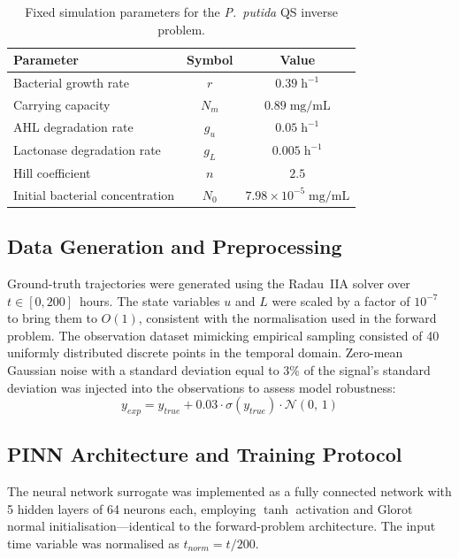 \documentclass[14pt,a4paper,openany]{extbook}
\begin{document}
\begin{table}[hbt]
\centering
\caption[QS Inverse Problem: Fixed Parameters]{Fixed simulation parameters for the \textit{P.~putida} QS inverse problem.}
\label{tab:qs_inverse_fixed}
\begin{tabular}{lcc}
\hline
\textbf{Parameter} & \textbf{Symbol} & \textbf{Value} \\ \hline
Bacterial growth rate & $r$ & $0.39\;\mathrm{h}^{-1}$ \\
Carrying capacity & $N_m$ & $0.89\;\text{mg/mL}$ \\
AHL degradation rate & $g_u$ & $0.05\;\mathrm{h}^{-1}$ \\
Lactonase degradation rate & $g_L$ & $0.005\;\mathrm{h}^{-1}$ \\
Hill coefficient & $n$ & $2.5$ \\
Initial bacterial concentration & $N_0$ & $7.98 \times 10^{-5}\;\text{mg/mL}$ \\ \hline
\end{tabular}
\end{table}

\subsection{Data Generation and Preprocessing}
\label{subsec:qs_inverse_data}

Ground-truth trajectories were generated using the Radau~IIA solver over $t \in [0, 200]$~hours. The state variables $u$ and $L$ were scaled by a factor of $10^{-7}$ to bring them to $O(1)$, consistent with the normalisation used in the forward problem. The observation dataset mimicking empirical sampling consisted of 40 uniformly distributed discrete points in the temporal domain. Zero-mean Gaussian noise with a standard deviation equal to 3\% of the signal's standard deviation was injected into the observations to assess model robustness:
\begin{equation}
y_{exp} = y_{true} + 0.03 \cdot \sigma(y_{true}) \cdot \mathcal{N}(0,\, 1)
\end{equation}

\subsection{PINN Architecture and Training Protocol}
\label{subsec:qs_inverse_training}

The neural network surrogate was implemented as a fully connected network with 5 hidden layers of 64 neurons each, employing $\tanh$ activation and Glorot normal initialisation---identical to the forward-problem architecture. The input time variable was normalised as $t_{norm} = t/200$.
\end{document}
